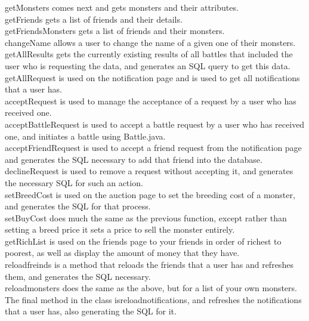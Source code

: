 \documentclass{project}
\begin{document}
getMonsters comes next and gets monsters and their attributes.\\
getFriends gets a list of friends and their details.\\
getFriendsMonsters gets a list of friends and their monsters.\\
changeName allows a user to change the name of a given one of their monsters.\\
getAllResults gets the currently existing results of all battles that included the user who is requesting the data, and generates an SQL query to get this data.\\
getAllRequest is used on the notification page and is used to get all notifications that a user has.\\
acceptRequest is used to manage the acceptance of a request by a user who has received one. \\
acceptBattleRequest is used to accept a battle request by a user who has received one, and initiates a battle using Battle.java.\\
acceptFriendRequest is used to accept a friend request from the notification page and generates the SQL necessary to add that friend into the database.\\
declineRequest is used to remove a request without accepting it, and generates the necessary SQL for such an action.\\
setBreedCost is used on the auction page to set the breeding cost of a monster, and generates the SQL for that process.\\
setBuyCost does much the same as the previous function, except rather than setting a breed price it sets a price to sell the monster entirely.\\
getRichList is used on the friends page to your friends in order of richest to poorest, as well as display the amount of money that they have.\\
reloadfreinds is a method that reloads the friends that a user has and refreshes them, and generates the SQL necessary.\\
reloadmonsters does the same as the above, but for a list of your own monsters.\\
The final method in the class isreloadnotifications, and refreshes the notifications that a user has, also generating the SQL for it.\\
\end{document}
